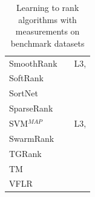 \documentclass[english, authoryear, preprint]{elsarticle}
\begin{document}
\begin{table}[!hpt]
{\begin{tabular}{lll}
SmoothRank & \cite{Chapelle2010} & L3, \cite{Chapelle2010}\\
SoftRank & \cite{Taylor2008, Guiver2008} & \cite{Qin2010b}\\
SortNet & \cite{Rigutini2008} & \cite{Rigutini2008,Freno2011, Papini2012}\\
SparseRank & \cite{Lai2013b} & \cite{Lai2013b}\\
SVM$^{MAP}$ & \cite{Yue2007} & L3, \cite{Wang2012, Xu2008, Niu2012}\\
SwarmRank & \cite{Diaz-Aviles2009} & \cite{Sato2013}\\
TGRank & \cite{Lai2013} & \cite{Lai2013}\\
TM & \cite{Zhou2008} & \cite{Zhou2008, Papini2012, Tan2013}\\
VFLR & \cite{Cai2012} & \cite{Cai2012}\\
\bottomrule
\end{tabular}
\caption{Learning to rank algorithms with measurements on benchmark datasets}}
\label{tab:ltr_methods_used}
\end{table}
\end{document}
